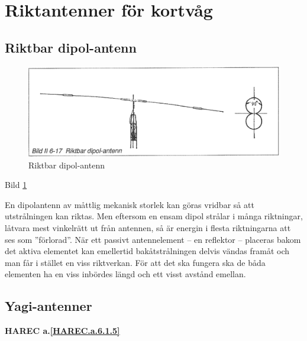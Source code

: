 \section{Riktantenner för kortvåg}

\subsection{Riktbar dipol-antenn}

\begin{figure}
  \includegraphics[width=\textwidth]{images/bild_2_6-17}
  \caption{Riktbar dipol-antenn}
  \label{fig:bildII6-17}
\end{figure}

Bild \ref{fig:bildII6-17}

En dipolantenn av måttlig mekanisk storlek kan göras vridbar så att
utstrålningen kan riktas. Men eftersom en ensam dipol strålar i många
riktningar, låtvara mest vinkelrätt ut från antennen, så är energin i
flesta riktningarna att ses som ''förlorad''. När ett passivt
antennelement -- en reflektor -- placeras bakom det aktiva elementet kan
emellertid bakåtstrålningen delvis vändas framåt och man får i stället
en viss riktverkan. För att det ska fungera ska de båda elementen
ha en viss inbördes längd och ett visst avstånd emellan.


\subsection{Yagi-antenner}
\textbf{
HAREC a.\ref{HAREC.a.6.1.5}\label{myHAREC.a.6.1.5}
}


